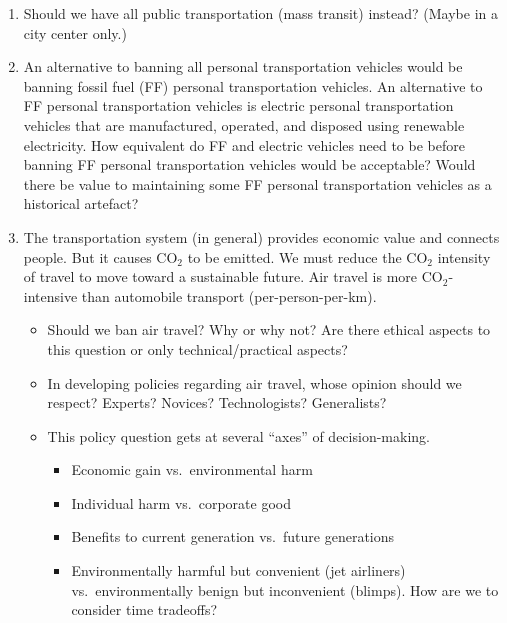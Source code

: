 \documentclass[12pt]{article}
\begin{document}
\begin{enumerate}
	\item Should we have all public transportation (mass transit) instead? (Maybe in a city center only.)
	
	
	
	
	

  \item An alternative to banning all personal transportation vehicles would be banning 
        fossil fuel (FF) personal transportation vehicles. 
		An alternative to FF personal transportation vehicles is electric personal transportation vehicles
		that are manufactured, operated, and disposed using renewable electricity.  
        How equivalent do FF and electric vehicles need to be before banning FF
		personal transportation vehicles would be acceptable?
		Would there be value to maintaining some FF personal transportation vehicles 
		as a historical artefact? 
  
  \item The transportation system (in general) provides economic value and connects people. 
        But it causes CO$_2$ to be emitted. 
		We must reduce the CO$_2$ intensity of travel to move toward a sustainable future. 
		Air travel is more CO$_2$-intensive than automobile transport (per-person-per-km). 
		\begin{itemize}

		  \item Should we ban air travel? 
		        Why or why not? 
				Are there ethical aspects to this question or 
				only technical/practical aspects? 

		  \item In developing policies regarding air travel, whose opinion should we respect? 
		        Experts? Novices? Technologists? Generalists? 
				
  		  \item This policy question gets at several “axes” of decision-making.
  		  \begin{itemize}

  		    \item Economic gain vs.\ environmental harm  

  		    \item Individual harm vs.\ corporate good
		  
  		    \item Benefits to current generation vs.\ future generations
		  
  		    \item Environmentally harmful but convenient (jet airliners) vs.\ 
  		          environmentally benign but inconvenient (blimps).
  			      How are we to consider time tradeoffs?


\end{itemize}
\end{itemize}
\end{enumerate}
\end{document}
